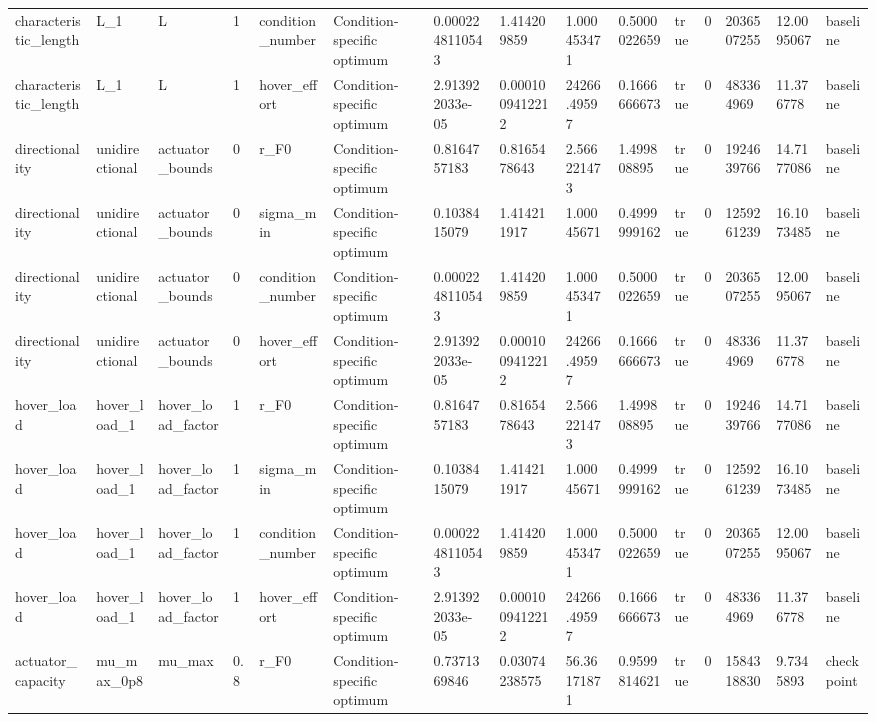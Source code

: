 \begin{tabular}{@{}lllllllllllllll@{}}
characteristic\_length & L\_1 & L & 1 & condition\_number & Condition-specific optimum & 0.0002248110543 & 1.414209859 & 1.000453471 & 0.5000022659 & true & 0 & 2036507255 & 12.0095067 & baseline \\
characteristic\_length & L\_1 & L & 1 & hover\_effort & Condition-specific optimum & 2.913922033e-05 & 0.0001009412212 & 24266.49597 & 0.1666666673 & true & 0 & 483364969 & 11.376778 & baseline \\
directionality & unidirectional & actuator\_bounds & 0 & r\_F0 & Condition-specific optimum & 0.8164757183 & 0.8165478643 & 2.566221473 & 1.499808895 & true & 0 & 1924639766 & 14.7177086 & baseline \\
directionality & unidirectional & actuator\_bounds & 0 & sigma\_min & Condition-specific optimum & 0.1038415079 & 1.414211917 & 1.00045671 & 0.4999999162 & true & 0 & 1259261239 & 16.1073485 & baseline \\
directionality & unidirectional & actuator\_bounds & 0 & condition\_number & Condition-specific optimum & 0.0002248110543 & 1.414209859 & 1.000453471 & 0.5000022659 & true & 0 & 2036507255 & 12.0095067 & baseline \\
directionality & unidirectional & actuator\_bounds & 0 & hover\_effort & Condition-specific optimum & 2.913922033e-05 & 0.0001009412212 & 24266.49597 & 0.1666666673 & true & 0 & 483364969 & 11.376778 & baseline \\
hover\_load & hover\_load\_1 & hover\_load\_factor & 1 & r\_F0 & Condition-specific optimum & 0.8164757183 & 0.8165478643 & 2.566221473 & 1.499808895 & true & 0 & 1924639766 & 14.7177086 & baseline \\
hover\_load & hover\_load\_1 & hover\_load\_factor & 1 & sigma\_min & Condition-specific optimum & 0.1038415079 & 1.414211917 & 1.00045671 & 0.4999999162 & true & 0 & 1259261239 & 16.1073485 & baseline \\
hover\_load & hover\_load\_1 & hover\_load\_factor & 1 & condition\_number & Condition-specific optimum & 0.0002248110543 & 1.414209859 & 1.000453471 & 0.5000022659 & true & 0 & 2036507255 & 12.0095067 & baseline \\
hover\_load & hover\_load\_1 & hover\_load\_factor & 1 & hover\_effort & Condition-specific optimum & 2.913922033e-05 & 0.0001009412212 & 24266.49597 & 0.1666666673 & true & 0 & 483364969 & 11.376778 & baseline \\
actuator\_capacity & mu\_max\_0p8 & mu\_max & 0.8 & r\_F0 & Condition-specific optimum & 0.7371369846 & 0.03074238575 & 56.36171871 & 0.9599814621 & true & 0 & 1584318830 & 9.7345893 & checkpoint \\

\end{tabular}
